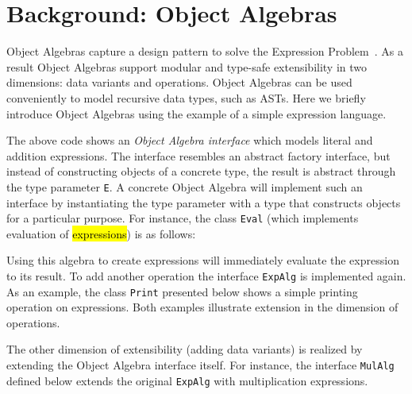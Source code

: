 \section{Background: Object Algebras}\label{subsec:ObjectAlgebras}

Object Algebras capture a design pattern to solve the Expression
Problem~\cite{wadler98expression-problem}.  As a result Object
Algebras support modular and type-safe extensibility in two
dimensions: data variants and operations. Object Algebras can be used
conveniently to model recursive data types, such as ASTs. Here we
briefly introduce Object Algebras using the example of a simple
expression language.


The above code shows an \emph{Object Algebra interface} which models
literal and addition expressions. The interface resembles an abstract
factory interface, but instead of constructing objects of a concrete
type, the result is abstract through the type parameter \lstinline{E}.
A concrete Object Algebra will implement such an interface by
instantiating the type parameter with a type that constructs objects
for a particular purpose. For instance, the class \lstinline{Eval}
(which implements evaluation of \hl{expressions}) is as follows:


Using this algebra to create expressions will immediately evaluate
the expression to its result. To add another operation the interface
\lstinline{ExpAlg} is implemented again. As an example, the class
\lstinline{Print} presented below shows a simple printing operation on
expressions. Both examples illustrate extension in the dimension of
operations.



The other dimension of extensibility (adding data variants) is
realized by extending the Object Algebra interface itself. For
instance, the interface \lstinline{MulAlg} defined below extends the
original \lstinline{ExpAlg} with multiplication expressions.

